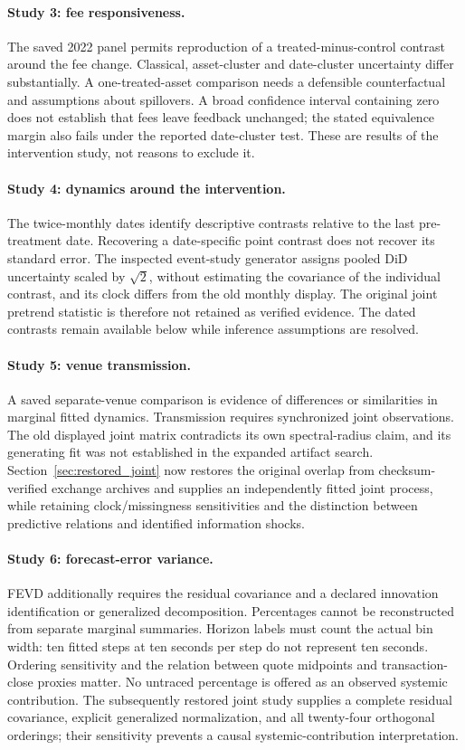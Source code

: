 \paragraph{Study 3: fee responsiveness.}
The saved 2022 panel permits reproduction of a treated-minus-control contrast around the fee change. Classical, asset-cluster and date-cluster uncertainty differ substantially. A one-treated-asset comparison needs a defensible counterfactual and assumptions about spillovers. A broad confidence interval containing zero does not establish that fees leave feedback unchanged; the stated equivalence margin also fails under the reported date-cluster test. These are results of the intervention study, not reasons to exclude it.

\paragraph{Study 4: dynamics around the intervention.}
The twice-monthly dates identify descriptive contrasts relative to the last pre-treatment date. Recovering a date-specific point contrast does not recover its standard error. The inspected event-study generator assigns pooled DiD uncertainty scaled by $\sqrt2$, without estimating the covariance of the individual contrast, and its clock differs from the old monthly display. The original joint pretrend statistic is therefore not retained as verified evidence. The dated contrasts remain available below while inference assumptions are resolved.

\paragraph{Study 5: venue transmission.}
A saved separate-venue comparison is evidence of differences or similarities in marginal fitted dynamics. Transmission requires synchronized joint observations. The old displayed joint matrix contradicts its own spectral-radius claim, and its generating fit was not established in the expanded artifact search. Section~\ref{sec:restored_joint} now restores the original overlap from checksum-verified exchange archives and supplies an independently fitted joint process, while retaining clock/missingness sensitivities and the distinction between predictive relations and identified information shocks.

\paragraph{Study 6: forecast-error variance.}
FEVD additionally requires the residual covariance and a declared innovation identification or generalized decomposition. Percentages cannot be reconstructed from separate marginal summaries. Horizon labels must count the actual bin width: ten fitted steps at ten seconds per step do not represent ten seconds. Ordering sensitivity and the relation between quote midpoints and transaction-close proxies matter. No untraced percentage is offered as an observed systemic contribution. The subsequently restored joint study supplies a complete residual covariance, explicit generalized normalization, and all twenty-four orthogonal orderings; their sensitivity prevents a causal systemic-contribution interpretation.

